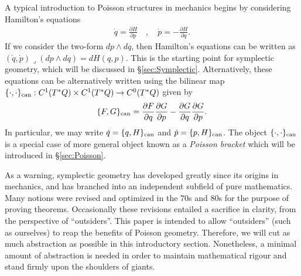\documentclass[12pt]{amsart}
\newcommand{\pder}[2]{\ensuremath{\frac{\partial #1}{\partial #2}}}
\begin{document}
A typical introduction to Poisson structures in mechanics
begins by considering Hamilton's equations
\begin{align*}
  \dot{q} = \pder{H}{p} \quad, \quad  \dot{p} = - \pder{H}{q}.
\end{align*}
If we consider the two-form $dp \wedge dq$, then Hamilton's equations
can be written as $(\dot{q},\dot{p}) \lrcorner (dp \wedge dq) = dH(q,p)$.
This is the starting point for symplectic geometry, which
will be discussed in \S \ref{sec:Symplectic}.
Alternatively, these equations can be alternatively written using the bilinear map $\{ \cdot , \cdot \}_{\rm can} : C^1( T^*Q) \times C^1(T^*Q) \to C^0(T^*Q)$
given by
\begin{align*}
  \{ F , G \}_{\rm can} = \pder{F}{q}\pder{G}{p} - \pder{G}{q} \pder{G}{p}.
\end{align*}
In particular, we may write $\dot{q} = \{ q , H \}_{\rm can}$ and $\dot{p} = \{ p , H\}_{\rm can}$.
The object $\{ \cdot , \cdot \}_{\rm can}$ is a special case of more general
object known as a \emph{Poisson bracket} which will be introduced in
\S \ref{sec:Poisson}.

As a warning, symplectic geometry has developed greatly
since its origins in mechanics, and
has branched into an independent subfield of pure mathematics.
Many notions were revised and optimized in the $70$s and $80$s for
the purpose of proving theorems.
Occasionally these revisions entailed a sacrifice
in clarity, from the perspective of ``outsiders''.
This paper is intended to allow ``outsiders''
(such as ourselves) to reap the benefits of Poisson geometry.
Therefore, we will cut as much abstraction as possible in this introductory
section.
Nonetheless, a minimal amount of abstraction is needed in order to
maintain mathematical rigour and stand firmly upon the shoulders of giants.
\end{document}
